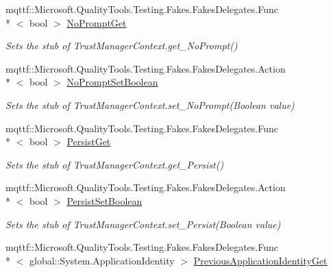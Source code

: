 \begin{DoxyCompactItemize}
mqttf\-::\-Microsoft.\-Quality\-Tools.\-Testing.\-Fakes.\-Fakes\-Delegates.\-Func\\*
$<$ bool $>$ \hyperlink{class_system_1_1_security_1_1_policy_1_1_fakes_1_1_stub_trust_manager_context_a4d1c96a8b2baa0590251231427f9f155}{No\-Prompt\-Get}
\begin{DoxyCompactList}\small\item\em Sets the stub of Trust\-Manager\-Context.\-get\-\_\-\-No\-Prompt()\end{DoxyCompactList}\item 
mqttf\-::\-Microsoft.\-Quality\-Tools.\-Testing.\-Fakes.\-Fakes\-Delegates.\-Action\\*
$<$ bool $>$ \hyperlink{class_system_1_1_security_1_1_policy_1_1_fakes_1_1_stub_trust_manager_context_a566bbd63400c82c5c7d1703053f593e9}{No\-Prompt\-Set\-Boolean}
\begin{DoxyCompactList}\small\item\em Sets the stub of Trust\-Manager\-Context.\-set\-\_\-\-No\-Prompt(\-Boolean value)\end{DoxyCompactList}\item 
mqttf\-::\-Microsoft.\-Quality\-Tools.\-Testing.\-Fakes.\-Fakes\-Delegates.\-Func\\*
$<$ bool $>$ \hyperlink{class_system_1_1_security_1_1_policy_1_1_fakes_1_1_stub_trust_manager_context_a95df8e44d6d8778cdb4ffd2a63a0372c}{Persist\-Get}
\begin{DoxyCompactList}\small\item\em Sets the stub of Trust\-Manager\-Context.\-get\-\_\-\-Persist()\end{DoxyCompactList}\item 
mqttf\-::\-Microsoft.\-Quality\-Tools.\-Testing.\-Fakes.\-Fakes\-Delegates.\-Action\\*
$<$ bool $>$ \hyperlink{class_system_1_1_security_1_1_policy_1_1_fakes_1_1_stub_trust_manager_context_a1d1f0ee70ba20b095421b065d820796c}{Persist\-Set\-Boolean}
\begin{DoxyCompactList}\small\item\em Sets the stub of Trust\-Manager\-Context.\-set\-\_\-\-Persist(\-Boolean value)\end{DoxyCompactList}\item 
mqttf\-::\-Microsoft.\-Quality\-Tools.\-Testing.\-Fakes.\-Fakes\-Delegates.\-Func\\*
$<$ global\-::\-System.\-Application\-Identity $>$ \hyperlink{class_system_1_1_security_1_1_policy_1_1_fakes_1_1_stub_trust_manager_context_a27e67ae5b95da12c6510d59eb49a51fe}{Previous\-Application\-Identity\-Get}

\end{DoxyCompactItemize}
